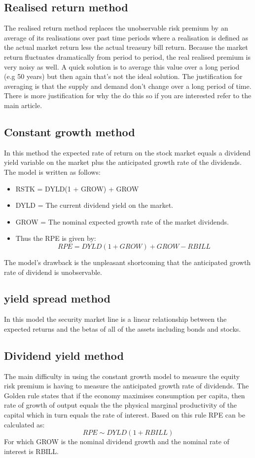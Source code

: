 \documentclass[12 pt]{article}
\begin{document}
\subsection{Realised return method}
The realised return method replaces the unobservable risk premium by an average of its realisations over past time periods where a realisation is defined as the actual market return less the actual treasury bill return. Because the market return fluctuates dramatically from period to period, the real realised premium is very noisy as well. A quick solution is to average this value over a long period (e.g 50 years) but then again that's not the ideal solution.  The justification for averaging is that the supply and demand don't change over a long period of time. There is more justification for why the do this so if you are interested refer to the main article.  
\subsection{Constant growth method}
In this method the expected rate of return on the stock market equals a dividend yield variable on the market plus the anticipated growth rate of the dividends. The model is written as follows: 
\begin{itemize}
\item RSTK = DYLD(1 + GROW) + GROW 
\item DYLD = The current dividend yield on the market. \
\item GROW = The nominal expected growth rate of the market dividends.  
\item Thus the RPE is given by: 
\[
RPE = DYLD(1+GROW) + GROW - RBILL
\] 
\end{itemize}
The model's drawback is the unpleasant shortcoming that the anticipated growth rate of dividend is unobservable. 
\subsection{yield spread method}
In this model the security market line is a linear relationship between the expected returns and the betas of all of the assets including bonds and stocks. 
\subsection{Dividend yield method}
The main difficulty in using the constant growth model to measure the equity risk premium is having to measure the anticipated growth rate of dividends. The Golden rule states that if the economy maximises consumption per capita, then rate of growth of output equals the the physical marginal productivity of the capital which in turn equals the rate of interest. Based on this rule RPE can be calculated as: \
\[
RPE \sim DYLD(1  + RBILL) 
\]
For which GROW is the nominal dividend growth and the nominal rate of interest is RBILL. 
\end{document}
